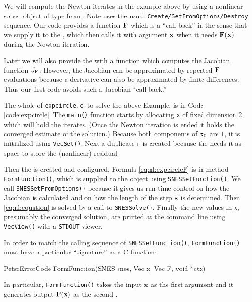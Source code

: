 We will compute the Newton iterates in the example above by using a nonlinear solver object of type \pSNES{} from \PETSc.  Note \pSNES uses the usual \texttt{Create/SetFromOptions/Destroy} sequence.  Our code provides a function $\mathbf{F}$ which is a ``call-back'' in the sense that we supply it to the \pSNES, which then calls it with argument $\mathbf{x}$ when it needs $\mathbf{F}(\mathbf{x})$ during the Newton iteration.

Later we will also provide the \pSNES with a function which computes the Jacobian function $J_{\mathbf{F}}$.  However, the Jacobian can be approximated by repeated $\mathbf{F}$ evaluations because a derivative can also be approximated by finite differences.  Thus our first code avoids such a Jacobian ``call-back.''

The whole of \texttt{expcircle.c}, to solve the above Example, is in Code \ref{code:expcircle}.  The \texttt{main()} function starts by allocating \pVec \texttt{x} of fixed dimension 2 which will hold the iterates.  (Once the Newton iteration is ended it holds the converged estimate of the solution.)  Because both components of $\mathbf{x}_0$ are $1$, it is initialized using \texttt{VecSet()}.  Next a duplicate \pVec \texttt{r} is created because the \pSNES needs it as space to store the (nonlinear) residual.

Then the \pSNES is created and configured.  Formula \eqref{eq:nl:expcircleF} is in method \texttt{FormFunction()}, which is supplied to the \pSNES object using \texttt{SNESSetFunction()}.  We call \texttt{SNESSetFromOptions()} because it gives us run-time control on how the Jacobian is calculated and on how the length of the step $\mathbf{s}$ is determined.  Then \eqref{eq:nl:equation} is solved by a call to \texttt{SNESSolve()}.  Finally the new values in \texttt{x}, presumably the converged solution, are printed at the command line using \texttt{VecView()} with a \texttt{STDOUT} viewer.

\vfill
{}

In order to match the calling sequence of \texttt{SNESSetFunction()}, \texttt{FormFunction()} must have a particular ``signature'' as a C function:
\begin{code}
PetscErrorCode FormFunction(SNES snes, Vec x, Vec F, void *ctx)
\end{code}
In particular, \texttt{FormFunction()} takes the input $\mathbf{x}$ as the first \pVec argument and it generates output $\mathbf{F}(\mathbf{x})$ as the second \pVec.

